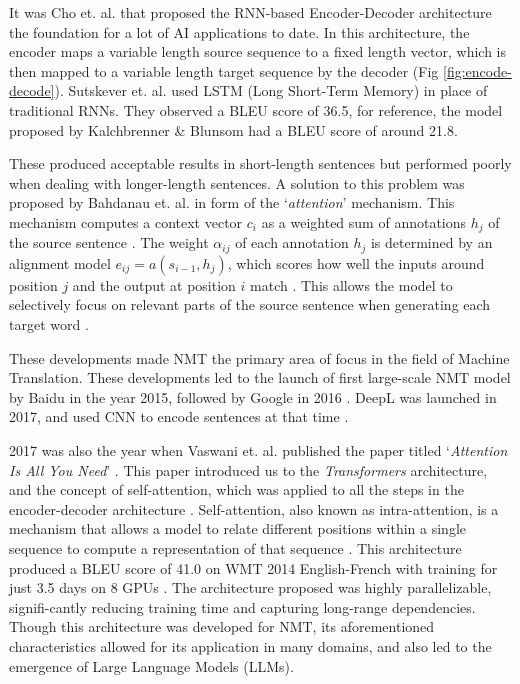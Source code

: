 It was Cho et. al. \cite{cho2014learning} that proposed the RNN-based Encoder-Decoder architecture the foundation for a lot of AI applications to date. In this architecture, the encoder maps a variable length source sequence to a fixed length vector, which is then mapped to a variable length target sequence by the decoder (Fig \ref{fig:encode-decode}). Sutskever et. al. \cite{sutskever2014sequence} used LSTM (Long Short-Term Memory) in place of traditional RNNs. They observed a BLEU score of 36.5, for reference, the model proposed by Kalchbrenner \& Blunsom \cite{kalchbrenner2013recurrent} had a BLEU score of around 21.8.

These produced acceptable results in short-length sentences but performed poorly when dealing with longer-length sentences. A solution to this problem was proposed by Bahdanau et. al. \cite{bahdanau2014neural} in form of the `\textit{attention}' mechanism. This mechanism computes a context vector $ c_i $ as a weighted sum of annotations $ h_j $ of the source sentence \cite{bahdanau2014neural}. The weight $ \alpha_{ij} $  of each annotation  $ h_j $  is determined by an alignment model $ e_{ij} = a(s_{i-1}, h_j) $, which scores how well the inputs around position $ j $ and the output at position $ i $ match \cite{bahdanau2014neural}. This allows the model to selectively focus on relevant parts of the source sentence when generating each target word \cite{bahdanau2014neural}.

These developments made NMT the primary area of focus in the field of Machine Translation. These developments led to the launch of first large-scale NMT model by Baidu \cite{he2015baidu} in the year 2015, followed by Google in 2016 \cite{wu2016google}. DeepL was launched in 2017, and used CNN to encode sentences at that time \cite{schmitt2019translation}.

2017 was also the year when Vaswani et. al. published the paper titled `\textit{Attention Is All You Need}' \cite{vaswani2017attention}. This paper introduced us to the \textit{Transformers} architecture, and the concept of self-attention, which was applied to all the steps in the encoder-decoder architecture \cite{vaswani2017attention}. Self-attention, also known as intra-attention, is a mechanism that allows a model to relate different positions within a single sequence to compute a representation of that sequence \cite{vaswani2017attention}. This architecture produced a BLEU score of 41.0 on WMT 2014 English-French with training for just 3.5 days on 8 GPUs \cite{vaswani2017attention}. The architecture proposed was highly parallelizable, signifi-cantly reducing training time and capturing long-range dependencies. Though this architecture was developed for NMT, its aforementioned characteristics allowed for its application in many domains, and also led to the emergence of Large Language Models (LLMs).


